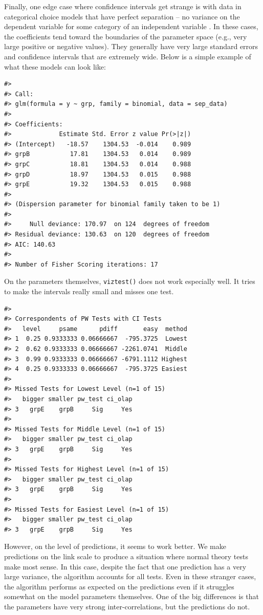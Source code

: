 Finally, one edge case where confidence intervals get strange is with data in categorical choice models that have perfect separation -- no variance on the dependent variable for some category of an independent variable \citep{Firth1993, Zorn2005}. In these cases, the coefficients tend toward the boundaries of the parameter space (e.g., very large positive or negative values). They generally have very large standard errors and confidence intervals that are extremely wide. Below is a simple example of what these models can look like:

\begin{verbatim}
#> 
#> Call:
#> glm(formula = y ~ grp, family = binomial, data = sep_data)
#> 
#> Coefficients:
#>             Estimate Std. Error z value Pr(>|z|)
#> (Intercept)   -18.57    1304.53  -0.014    0.989
#> grpB           17.81    1304.53   0.014    0.989
#> grpC           18.81    1304.53   0.014    0.988
#> grpD           18.97    1304.53   0.015    0.988
#> grpE           19.32    1304.53   0.015    0.988
#> 
#> (Dispersion parameter for binomial family taken to be 1)
#> 
#>     Null deviance: 170.97  on 124  degrees of freedom
#> Residual deviance: 130.63  on 120  degrees of freedom
#> AIC: 140.63
#> 
#> Number of Fisher Scoring iterations: 17
\end{verbatim}

On the parameters themselves, \texttt{viztest()} does not work especially well. It tries to make the intervals really small and misses one test.

\begin{verbatim}
#> 
#> Correspondents of PW Tests with CI Tests
#>   level     psame      pdiff       easy  method
#> 1  0.25 0.9333333 0.06666667  -795.3725  Lowest
#> 2  0.62 0.9333333 0.06666667 -2261.0741  Middle
#> 3  0.99 0.9333333 0.06666667 -6791.1112 Highest
#> 4  0.25 0.9333333 0.06666667  -795.3725 Easiest
#> 
#> Missed Tests for Lowest Level (n=1 of 15)
#>   bigger smaller pw_test ci_olap
#> 3   grpE    grpB     Sig     Yes
#> 
#> Missed Tests for Middle Level (n=1 of 15)
#>   bigger smaller pw_test ci_olap
#> 3   grpE    grpB     Sig     Yes
#> 
#> Missed Tests for Highest Level (n=1 of 15)
#>   bigger smaller pw_test ci_olap
#> 3   grpE    grpB     Sig     Yes
#> 
#> Missed Tests for Easiest Level (n=1 of 15)
#>   bigger smaller pw_test ci_olap
#> 3   grpE    grpB     Sig     Yes
\end{verbatim}

However, on the level of predictions, it seems to work better. We make predictions on the link scale to produce a situation where normal theory tests make most sense. In this case, despite the fact that one prediction has a very large variance, the algorithm accounts for all tests. Even in these stranger cases, the algorithm performs as expected on the predictions even if it struggles somewhat on the model parameters themselves. One of the big differences is that the parameters have very strong inter-correlations, but the predictions do not.

